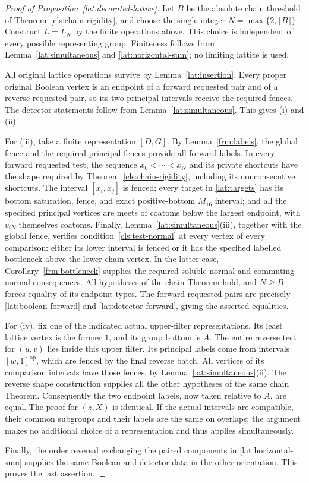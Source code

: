\begin{proof}[Proof of Proposition~\ref{lat:decorated-lattice}]
Let $B$ be the absolute chain threshold of
Theorem~\ref{cls:chain-rigidity}, and choose the single integer
$N=\max\{2,\lceil B\rceil\}$.  Construct $L=L_N$ by the finite operations above.
This choice is independent of every possible representing group.
Finiteness follows from Lemma~\ref{lat:simultaneous} and
\eqref{lat:horizontal-sum}; no limiting lattice is used.

All original lattice operations survive by
Lemma~\ref{lat:insertion}.  Every proper original Boolean vertex is
an endpoint of a forward requested pair and of a reverse requested
pair, so its two principal intervals receive the required fences.
The detector statements follow from
Lemma~\ref{lat:simultaneous}.  This gives (i) and (ii).

For (iii), take a finite representation $[D,G]$.  By
Lemma~\ref{frm:labels}, the global fence and the required principal
fences provide all forward labels.  In every forward requested test,
the sequence $x_0<\cdots<x_N$ and its private shortcuts have the
shape required by Theorem~\ref{cls:chain-rigidity}, including its
nonconsecutive shortcuts.  The interval $[x_i,x_j]$ is fenced;
every target in \eqref{lat:targets} has its bottom saturation,
fence, and exact positive-bottom $M_{16}$ interval; and all the
specified principal vertices are meets of coatoms below the largest
endpoint, with $v_{iN}$ themselves coatoms.  Finally,
Lemma~\ref{lat:simultaneous}(iii), together with the global fence,
verifies condition~\ref{cls:test-normal} at every vertex of every comparison:
either its lower interval is fenced or it has the specified labelled
bottleneck above the lower chain vertex.  In the latter case,
Corollary~\ref{frm:bottleneck} supplies the required soluble-normal
and commuting-normal consequences.  All hypotheses of the
chain Theorem hold, and $N\geq B$ forces equality of its endpoint
types.  The forward requested pairs are precisely
\eqref{lat:boolean-forward} and \eqref{lat:detector-forward}, giving
the asserted equalities.

For (iv), fix one of the indicated actual upper-filter
representations.  Its least lattice vertex is the former $1$, and
its group bottom is $A$.  The entire reverse test for $(u,v)$ lies
inside this upper filter.  Its principal labels come from intervals
$[w,1]^{\mathrm{op}}$, which are fenced by the final reverse batch.
All vertices of its comparison intervals have those fences, by
Lemma~\ref{lat:simultaneous}(ii).  The reverse shape construction
supplies all the other hypotheses of the same chain Theorem.
Consequently the two endpoint labels, now taken relative to $A$,
are equal.  The proof for $(z,X)$ is identical.  If the actual
intervals are compatible, their common subgroups and their labels
are the same on overlaps; the argument makes no additional choice of
a representation and thus applies simultaneously.

Finally, the order reversal exchanging the paired components in
\eqref{lat:horizontal-sum} supplies the same Boolean and detector
data in the other orientation.  This proves the last assertion.
\end{proof}

